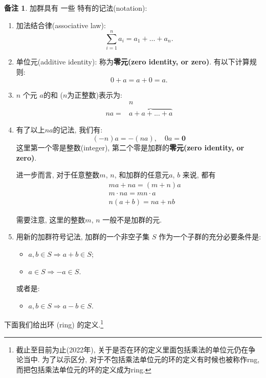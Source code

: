 \documentclass[utf8]{ctexbook}
\theoremstyle{definition}
\newtheorem{memo}{备注}[section]
\begin{document}
\begin{memo}
加群具有 一些 特有的记法(notation):
\begin{enumerate}
\item{加法结合律(associative law): $$ \sum_{i=1} ^n a_i = a_1 + \ldots + a_n . $$}
\item{单位元(additive identity): 称为\textbf{零元(zero identity, or zero)}. 有以下计算规则:
$$ 0 + a = a + 0 = a .$$
}
\item{$n$ 个元 $a$的和 ($n$为正整数)表示为:
\begin{equation}
\begin{array}{cc}
 & n \\ 
 n a  = & \overbrace{a + a + ... + a} 
\end{array}
\end{equation}
}
\item{有了以上$na$的记法, 我们有:
\begin{equation}
(-n)a = - (na), \quad 0 a = \mathbf{0}
\end{equation}
这里第一个零是整数(integer), 第二个零是加群的\textbf{零元(zero identity, or zero)}.

进一步而言, 对于任意整数$m$, $n$, 和加群的任意元$a$, $b$ 来说, 都有
\begin{eqnarray}
& & ma + na = (m+n) a \\
& & m \cdot n a = m n \cdot a \\
& & n(a+b) = na + nb 
\end{eqnarray} 

需要注意, 这里的整数$m$, $n$ 一般不是加群的元. 
}
\item{用新的加群符号记法, 加群的一个非空子集 $S$ 作为一个子群的充分必要条件是:
\begin{itemize}
\item{$a, b \in S \Rightarrow a + b \in S$;}
\item{$a \in S \Rightarrow -a \in S$.}

\end{itemize}
或者是:
\begin{itemize}
\item{$a, b \in S \Rightarrow a-b \in S$.}
\end{itemize}
}
\end{enumerate}
\end{memo}

下面我们给出环 (ring) 的定义.\footnote{截止至目前为止(2022年), 关于是否在环的定义里面包括乘法的单位元仍在争论当中. 为了以示区分, 对于不包括乘法单位元的环的定义有时候也被称作rng, 而把包括乘法单位元的环的定义成为ring.}
\end{document}
